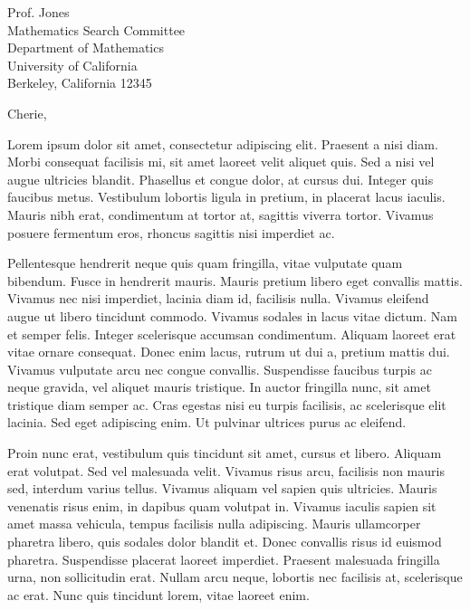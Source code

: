 \documentclass[11pt, a4paper]{letter} %
\begin{document}

\begin{letter}{
	Prof. Jones\\
	Mathematics Search Committee\\
	Department of Mathematics\\
	University of California\\
	Berkeley, California 12345
}


\opening{Cherie,}

Lorem ipsum dolor sit amet, consectetur adipiscing elit. Praesent a nisi diam. Morbi consequat facilisis mi, sit amet laoreet velit aliquet quis. Sed a nisi vel augue ultricies blandit. Phasellus et congue dolor, at cursus dui. Integer quis faucibus metus. Vestibulum lobortis ligula in pretium, in placerat lacus iaculis. Mauris nibh erat, condimentum at tortor at, sagittis viverra tortor. Vivamus posuere fermentum eros, rhoncus sagittis nisi imperdiet ac.

Pellentesque hendrerit neque quis quam fringilla, vitae vulputate quam bibendum. Fusce in hendrerit mauris. Mauris pretium libero eget convallis mattis. Vivamus nec nisi imperdiet, lacinia diam id, facilisis nulla. Vivamus eleifend augue ut libero tincidunt commodo. Vivamus sodales in lacus vitae dictum. Nam et semper felis. Integer scelerisque accumsan condimentum. Aliquam laoreet erat vitae ornare consequat. Donec enim lacus, rutrum ut dui a, pretium mattis dui. Vivamus vulputate arcu nec congue convallis. Suspendisse faucibus turpis ac neque gravida, vel aliquet mauris tristique. In auctor fringilla nunc, sit amet tristique diam semper ac. Cras egestas nisi eu turpis facilisis, ac scelerisque elit lacinia. Sed eget adipiscing enim. Ut pulvinar ultrices purus ac eleifend.

Proin nunc erat, vestibulum quis tincidunt sit amet, cursus et libero. Aliquam erat volutpat. Sed vel malesuada velit. Vivamus risus arcu, facilisis non mauris sed, interdum varius tellus. Vivamus aliquam vel sapien quis ultricies. Mauris venenatis risus enim, in dapibus quam volutpat in. Vivamus iaculis sapien sit amet massa vehicula, tempus facilisis nulla adipiscing. Mauris ullamcorper pharetra libero, quis sodales dolor blandit et. Donec convallis risus id euismod pharetra. Suspendisse placerat laoreet imperdiet. Praesent malesuada fringilla urna, non sollicitudin erat. Nullam arcu neque, lobortis nec facilisis at, scelerisque ac erat. Nunc quis tincidunt lorem, vitae laoreet enim.


\end{letter}
\end{document}
